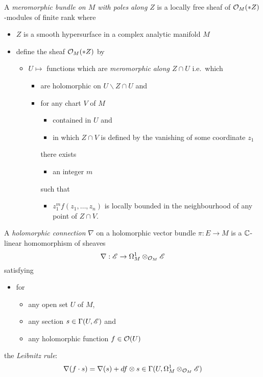 \begin{defn}
  A \emph{meromorphic bundle on $M$ with poles along $Z$} is a locally free
  sheaf of $\mathcal{O}_M(*Z)$-modules of finite rank
  where
  \begin{itemize}
    \item $Z$ is a smooth hypersurface in a complex analytic manifold $M$
    \item define the sheaf $\mathcal{O}_M(*Z)$ by
      \begin{itemize}
        \item $U\mapsto$ functions which are \emph{meromorphic along $Z\cap U$}
          i.e.\ which
          \begin{itemize}
            \item are holomorphic on $U\backslash Z\cap U$ and
            \item for any chart $V$ of $M$
              \begin{itemize}
                \item contained in $U$ and
                \item in which $Z\cap V$ is defined by the vanishing of some
                  coordinate $z_1$
              \end{itemize}
              there exists
              \begin{itemize}
                \item an integer $m$
              \end{itemize}
              such that
              \begin{itemize}
                \item $z_1^mf(z_1,\dots,z_n)$ is locally bounded in the
                  neighbourhood of any point of $Z\cap V$.
              \end{itemize}
          \end{itemize}
      \end{itemize}
  \end{itemize}
\end{defn}
\begin{defn}
  A \emph{holomorphic connection} $\nabla$ on a holomorphic vector bundle
  $\pi:E\to M$ is a $\mathbb{C}$-linear homomorphism of sheaves
  \[
    \nabla:\mathscr{E}\to\Omega_M^1\otimes_{\mathcal{O}_M}\mathscr{E}
  \]
  satisfying
  \begin{itemize}
    \item for
      \begin{itemize}
        \item any open set $U$ of $M$,
        \item any section $s\in\Gamma(U,\mathscr{E})$ and
        \item any holomorphic function $f\in\mathcal{O}(U)$
      \end{itemize}
  \end{itemize}
  the \emph{Leibnitz rule}:
  \[
    \nabla(f\cdot s)=\nabla(s)+df\otimes
    s\in\Gamma(U,\Omega_M^1\otimes_{\mathcal{O}_M}\mathscr{E})
  \]
\end{defn}
